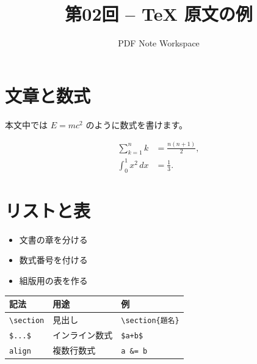 \documentclass[11pt]{article}
\title{第02回 -- TeX 原文の例}
\author{PDF Note Workspace}
\date{}
\begin{document}
\maketitle

\section{文章と数式}
本文中では $E = mc^2$ のように数式を書けます。

\begin{align}
  \sum_{k=1}^{n} k &= \frac{n(n+1)}{2}, \\
  \int_0^1 x^2\,dx &= \frac{1}{3}.
\end{align}

\section{リストと表}
\begin{itemize}
  \item 文書の章を分ける
  \item 数式番号を付ける
  \item 組版用の表を作る
\end{itemize}

\begin{tabular}{lll}
\toprule
記法 & 用途 & 例 \\
\midrule
\verb|\section| & 見出し & \verb|\section{題名}| \\
\verb|$...$| & インライン数式 & \verb|$a+b$| \\
\verb|align| & 複数行数式 & \verb|a &= b| \\
\bottomrule
\end{tabular}
\end{document}
